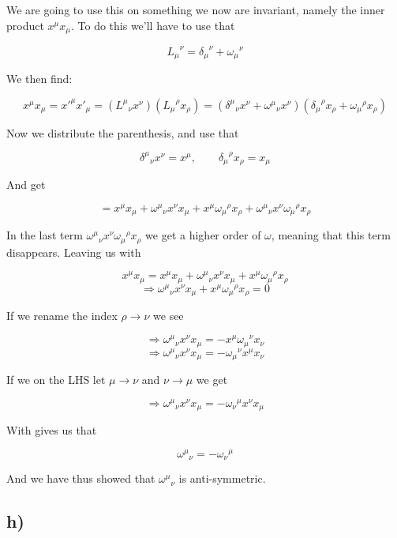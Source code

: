\documentclass[a4paper,norsk, 10pt]{article}
\begin{document}
We are going to use this on something we now are invariant, namely the inner product $x^{\mu}x_{\mu}$. To do this we'll have to use that

$$
{L_{\mu}}^{\nu} = {\delta_{\mu}}^{\nu} + {\omega_{\mu}}^{\nu}
$$

We then find:

$$
x^{\mu}x_{\mu} = {x'}^{\mu}{x'}_{\mu} = ({L^{\mu}}_{\nu}x^{\nu})({L_{\mu}}^{\rho}x_{\rho}) = ({\delta^{\mu}}_{\nu}x^{\nu} + {\omega^{\mu}}_{\nu} x^{\nu})({\delta_{\mu}}^{\rho}x_{\rho} + {\omega_{\mu}}^{\rho}x_{\rho})
$$

Now we distribute the parenthesis, and use that

$$
{\delta^{\mu}}_{\nu}x^{\nu} = x^{\mu},\qquad {\delta_{\mu}}^{\rho}x_{\rho} = x_{\mu}
$$

And get

$$
= x^{\mu}x_{\mu} + {\omega^{\mu}}_{\nu} x^{\nu}x_{\mu} + x^{\mu}{\omega_{\mu}}^{\rho}x_{\rho} + {\omega^{\mu}}_{\nu} x^{\nu}{\omega_{\mu}}^{\rho}x_{\rho}
$$

In the last term ${\omega^{\mu}}_{\nu} x^{\nu}{\omega_{\mu}}^{\rho}x_{\rho}$ we get a higher order of $\omega$, meaning that this term disappears. Leaving us with

$$
x^{\mu}x_{\mu} = x^{\mu}x_{\mu} + {\omega^{\mu}}_{\nu} x^{\nu}x_{\mu} + x^{\mu}{\omega_{\mu}}^{\rho}x_{\rho}
$$
$$
\Rightarrow {\omega^{\mu}}_{\nu} x^{\nu}x_{\mu} + x^{\mu}{\omega_{\mu}}^{\rho}x_{\rho} = 0
$$

If we rename the index $\rho \rightarrow \nu$ we see

$$
\Rightarrow {\omega^{\mu}}_{\nu} x^{\nu}x_{\mu} = - x^{\mu}{\omega_{\mu}}^{\nu}x_{\nu} 
$$
$$
\Rightarrow {\omega^{\mu}}_{\nu} x^{\nu}x_{\mu} = - {\omega_{\mu}}^{\nu}x^{\mu}x_{\nu} 
$$

If we on the LHS let $\mu \rightarrow \nu$ and $\nu \rightarrow \mu$ we get

$$
\Rightarrow {\omega^{\mu}}_{\nu} x^{\nu}x_{\mu} = - {\omega_{\nu}}^{\mu}x^{\nu}x_{\mu} 
$$

With gives us that

\begin{equation}
{\omega^{\mu}}_{\nu} = - {\omega_{\nu}}^{\mu}
\end{equation}

And we have thus showed that ${\omega^{\mu}}_{\nu}$ is anti-symmetric.



\subsection*{h)}
\end{document}

